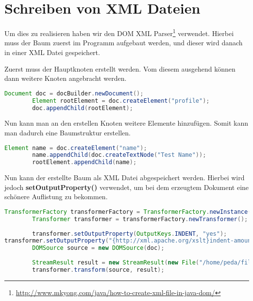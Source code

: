 \section{Schreiben von XML Dateien}
Um dies zu realisieren haben wir den DOM XML Parser\footnote{\url{http://www.mkyong.com/java/how-to-create-xml-file-in-java-dom/}} verwendet. Hierbei muss der Baum zuerst im Programm aufgebaut werden, und dieser wird danach in einer XML Datei gespeichert.

Zuerst muss der Hauptknoten erstellt werden. Vom diesem ausgehend können dann weitere Knoten angebracht werden.
\begin{lstlisting}[language=JAVA]
		Document doc = docBuilder.newDocument();
		Element rootElement = doc.createElement("profile");
		doc.appendChild(rootElement);
\end{lstlisting}

Nun kann man an den erstellen Knoten weitere Elemente hinzufügen. Somit kann man dadurch eine Baumstruktur erstellen.
\begin{lstlisting}[language=JAVA]
Element name = doc.createElement("name");
		name.appendChild(doc.createTextNode("Test Name"));
		rootElement.appendChild(name);
\end{lstlisting}

Nun kann der erstellte Baum als XML Datei abgespeichert werden. Hierbei wird jedoch \textbf{setOutputProperty()} verwendet, um bei dem erzeugtem Dokument eine schönere Auflistung zu bekommen.
\begin{lstlisting}[language=JAVA]
TransformerFactory transformerFactory = TransformerFactory.newInstance();
		Transformer transformer = transformerFactory.newTransformer();
		
		transformer.setOutputProperty(OutputKeys.INDENT, "yes");
transformer.setOutputProperty("{http://xml.apache.org/xslt}indent-amount", "2");
		DOMSource source = new DOMSource(doc);
		
		StreamResult result = new StreamResult(new File("/home/peda/file.xml"));
		transformer.transform(source, result);
\end{lstlisting}